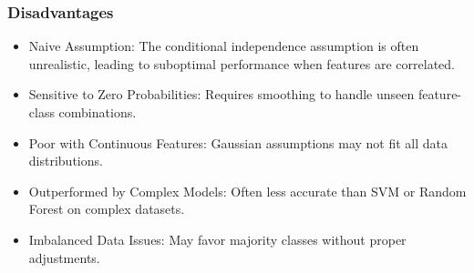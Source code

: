 \subsubsection{Disadvantages}
\begin{itemize}
    \item Naive Assumption: The conditional independence assumption is often unrealistic, leading to suboptimal performance when features are correlated.
    \item Sensitive to Zero Probabilities: Requires smoothing to handle unseen feature-class combinations.
    \item Poor with Continuous Features: Gaussian assumptions may not fit all data distributions.
    \item Outperformed by Complex Models: Often less accurate than SVM or Random Forest on complex datasets.
    \item Imbalanced Data Issues: May favor majority classes without proper adjustments.
\end{itemize}
